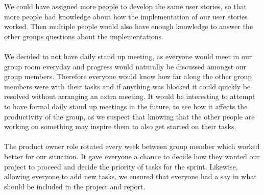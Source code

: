We could have assigned more people to develop the same user stories, so that more people had knowledge about how the implementation of our user stories worked. 
Then multiple people would also have enough knowledge to answer the other groups questions about the implementations.
\\\\
We decided to not have daily stand up meeting, as everyone would meet in our group room everyday and progress would naturally be discussed amongst our group members.
Therefore everyone would know how far along the other group members were with their tasks and if anything was blocked it could quickly be resolved without arranging an extra meeting.
It would be interesting to attempt to have formal daily stand up meetings in the future, to see how it affects the productivity of the group, as we suspect that knowing that the other people are working on something may inspire them to also get started on their tasks.
\\\\
The product owner role rotated every week between group member which worked better for our situation. 
It gave everyone a chance to decide how they wanted our project to proceed and decide the priority of tasks for the sprint.
Likewise, allowing everyone to add new tasks, we ensured that everyone had a say in what should be included in the project and report.
